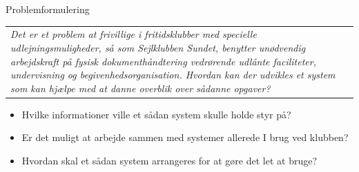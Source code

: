 \begin{frame}{Problemformulering}
\begin{tabular}{|p{8cm}|}
 \textit{Det er et problem at frivillige i fritidsklubber med specielle udlejningsmuligheder, så som Sejlklubben Sundet, benytter unødvendig arbejdskraft på fysisk dokumenthåndtering vedrørende udlånte faciliteter, undervisning og begivenhedsorganisation. Hvordan kan der udvikles et system som kan hjælpe med at danne overblik over sådanne opgaver?}
    \end{tabular}
  \begin{itemize}
  
    \item Hvilke informationer ville et sådan system skulle holde styr på?
    \item Er det muligt at arbejde sammen med systemer allerede I brug ved klubben?
    \item Hvordan skal et sådan system arrangeres for at gøre det let at bruge?
  \end{itemize}
\end{frame}